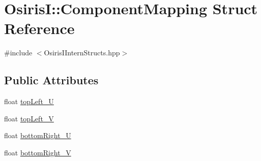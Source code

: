 \hypertarget{struct_osiris_i_1_1_component_mapping}{\section{Osiris\-I\-:\-:Component\-Mapping Struct Reference}
\label{struct_osiris_i_1_1_component_mapping}
}


{\ttfamily \#include $<$Osiris\-I\-Intern\-Structs.\-hpp$>$}

\subsection*{Public Attributes}
\begin{DoxyCompactItemize}
\item 
float \hyperlink{struct_osiris_i_1_1_component_mapping_aeebda2b0f18556233dafc0e854afa8c1}{top\-Left\-\_\-\-U}
\item 
float \hyperlink{struct_osiris_i_1_1_component_mapping_a94f10c8c1a589c30ba3c5e0cbd06dbe1}{top\-Left\-\_\-\-V}
\item 
float \hyperlink{struct_osiris_i_1_1_component_mapping_a8cde487eefa2a037328659e2c3b5a988}{bottom\-Right\-\_\-\-U}
\item 
float \hyperlink{struct_osiris_i_1_1_component_mapping_ae92e794cc34eb7716744b3a6747cc81e}{bottom\-Right\-\_\-\-V}
\end{DoxyCompactItemize}


